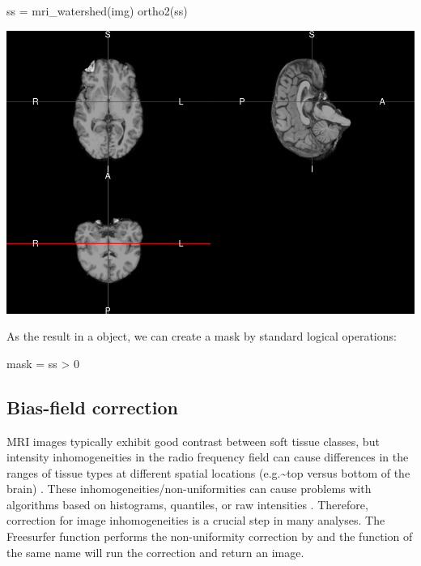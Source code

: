\begin{Schunk}
\begin{Sinput}
ss = mri_watershed(img)
ortho2(ss)
\end{Sinput}

\includegraphics{Freesurfer_files/figure-latex/watershed-1} \end{Schunk}

As the result in a  object, we can create a mask by standard
logical operations:

\begin{Schunk}
\begin{Sinput}
mask = ss > 0
\end{Sinput}
\end{Schunk}

\subsection{Bias-field correction}

MRI images typically exhibit good contrast between soft tissue classes,
but intensity inhomogeneities in the radio frequency field can cause
differences in the ranges of tissue types at different spatial locations
(e.g.\textasciitilde{}top versus bottom of the brain) . These
inhomogeneities/non-uniformities can cause problems with algorithms
based on histograms, quantiles, or raw intensities
\citep{zhang_segmentation_2001}. Therefore, correction for image
inhomogeneities is a crucial step in many analyses. The Freesurfer
function  performs the non-uniformity correction by
\citet{sled_nonparametric_1998} and the  function of the
same name will run the correction and return an image.

